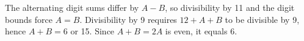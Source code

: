 The alternating digit sums differ by $A-B$, so divisibility by 11 and the digit bounds force $A=B$. Divisibility by 9 requires $12+A+B$ to be divisible by 9, hence $A+B=6$ or 15. Since $A+B=2A$ is even, it equals $\boxed6$.
